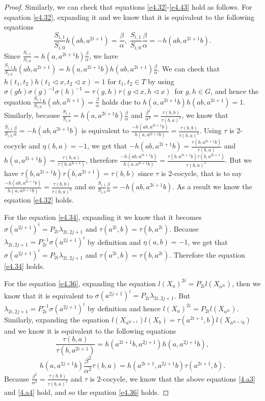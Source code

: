 \documentclass[a4paper,11pt]{amsart}
\numberwithin{equation}{section}
\begin{document}
\begin{proof}
Similarly, we can check that equations \ref{e4.32}-\ref{e4.43} hold as follows.
For equation \ref{e4.32}, expanding it and we know that it is equivalent to the following equations
\begin{equation}
\frac{S_{i,1}}{S_{i,0}}h(ab,a^{2i+1})=\frac{\beta}{\alpha},\; \frac{S_{i,1}}{S_{i,0}}\frac{\beta}{\alpha}=-h(ab,a^{2i+1}b). \label{a2}
\end{equation}
Since $\frac{S_{i,1}}{S_{i,0}}=h(a,a^{2i+1}b)\frac{\beta}{\alpha}$, we have
$\frac{S_{i,1}}{S_{i,0}}h(ab,a^{2i+1})=h(a,a^{2i+1}b)h(ab,a^{2i+1})\frac{\beta}{\alpha}$. We can check that $h(t_1,t_2)h(t_1\triangleleft x,t_2\triangleleft x)=1$ for $t_1,t_2\in T$ by using $\sigma(gh)\sigma(g)^{-1}\sigma(h)^{-1}=\tau(g,h)\tau(g\triangleleft x,h\triangleleft x)$\ for $g,h \in G$, and hence the equation $\frac{S_{i,1}}{S_{i,0}}h(ab,a^{2i+1})=\frac{\beta}{\alpha}$ holds due to $h(a,a^{2i+1}b)h(ab,a^{2i+1})=1$. Similarly, because $\frac{S_{i,1}}{S_{i,0}}=h(a,a^{2i+1}b)\frac{\beta}{\alpha}$ and $\frac{\beta^2}{\alpha^2}=\frac{\tau(b,b)}{\tau(b,a)^2}$, we know that $\frac{S_{i,1}}{S_{i,0}}\frac{\beta}{\alpha}=-h(ab,a^{2i+1}b)$ is equivalent to $\frac{-h(ab,a^{2i+1}b)}{h(a,a^{2i+1}b)}=\frac{\tau(b,b)}{\tau(b,a)^2}$. Using $\tau$ is 2-cocycle and $\eta(b,a)=-1$, we get that $-h(ab,a^{2i+1}b)=\frac{\tau(b,a^{2i+1}b)}{\tau(b,a)}$ and
$h(a,a^{2i+1}b)=\frac{\tau(b,a)}{\tau(b,a^{2i+1})}$, therefore $\frac{-h(ab,a^{2i+1}b)}{h(a,a^{2i+1}b)}=\frac{\tau(b,a^{2i+1}b) \tau(b,a^{2i+1})}{\tau(b,a)^2}$. But we have $\tau(b,a^{2i+1}b) \tau(b,a^{2i+1})=\tau(b,b)$ since $\tau$ is 2-cocycle, that is to say $\frac{-h(ab,a^{2i+1}b)}{h(a,a^{2i+1}b)}=\frac{\tau(b,b)}{\tau(b,a)^2}$ and so $\frac{S_{i,1}}{S_{i,0}}\frac{\beta}{\alpha}=-h(ab,a^{2i+1}b)$. As a result we know the equation \ref{e4.32} holds.

For the equation \ref{e4.34}, expanding it we know that it becomes $\sigma(a^{2j+1})^i=P_{2i}\lambda_{2i,2j+1}$ and $\tau(a^{2i},b)=\tau(b,a^{2i})$. Because $\lambda_{2i,2j+1}=P_{2i}^{-1}\sigma(a^{2j+1})^i$ by definition and $\eta(a,b)=-1$, we get that $\sigma(a^{2j+1})^i=P_{2i}\lambda_{2i,2j+1}$ and $\tau(a^{2i},b)=\tau(b,a^{2i})$. Therefore the equation \ref{e4.34} holds.

For the equation \ref{e4.36}, expanding the equation $l(X_a)^{2i}=P_{2i}l(X_{a^{2i}})$, then we know that it is equivalent to $\sigma(a^{2j+1})^i=P_{2i}\lambda_{2i,2j+1}$. But $\lambda_{2i,2j+1}=P_{2i}^{-1}\sigma(a^{2j+1})^i$ by definition and hence $l(X_a)^{2i}=P_{2i}l(X_{a^{2i}})$. Similarly, expanding the equation $l(X_{a^{2i+1}})l(X_b)=\tau(a^{2i+1},b)l(X_{a^{2i+1}b})$ and we know it is equivalent to the following equations
\begin{equation}
\frac{\tau(b,a)}{\tau(b,a^{2i+1})}=h(a^{2i+1}b,a^{2j+1})h(a,a^{2j+1}b), \label{4.a3}
\end{equation}
\begin{equation}
h(a,a^{2j+1}b) \frac{\beta^2}{\alpha^2} \tau(b,a)=h(a^{2i+1},a^{2j+1}b)\tau(a^{2i+1},b). \label{4.a4}
\end{equation}
Because $\frac{\beta^2}{\alpha^2}=\frac{\tau(b,b)}{\tau(b,a)^2}$ and $\tau$ is 2-cocycle, we know that the above equations \ref{4.a3} and \ref{4.a4} hold, and so the equation \ref{e4.36} holds.


\end{proof}
\end{document}
